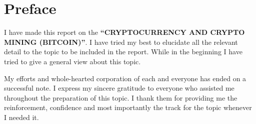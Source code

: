 \chapter*{Preface}
I have made this report on the \textbf{“CRYPTOCURRENCY AND CRYPTO MINING (BITCOIN)”}. I have tried my best to elucidate all the relevant detail to the topic to be included in the report. While in the beginning I have tried to give a general view about this topic.\vspace{.3cm}

My efforts and whole-hearted corporation of each and everyone has ended on a successful note. I express my sincere gratitude to everyone who assisted me throughout the preparation of this topic. I thank them for providing me the reinforcement, confidence and most importantly the track for the topic whenever I needed it.
